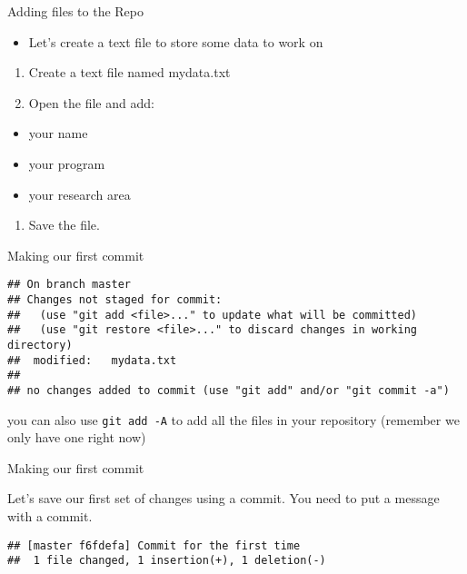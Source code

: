 \documentclass[ignorenonframetext,]{beamer}
\providecommand{\tightlist}{%
  \setlength{\itemsep}{0pt}\setlength{\parskip}{0pt}}
\begin{document}
\begin{frame}{Adding files to the Repo}

\begin{itemize}
\tightlist
\item
  Let's create a text file to store some data to work on
\end{itemize}

\begin{enumerate}
\def\labelenumi{\arabic{enumi}.}
\item
  Create a text file named mydata.txt
\item
  Open the file and add:
\end{enumerate}

\begin{itemize}
\tightlist
\item
  your name
\item
  your program
\item
  your research area
\end{itemize}

\begin{enumerate}
\def\labelenumi{\arabic{enumi}.}
\setcounter{enumi}{2}
\tightlist
\item
  Save the file.
\end{enumerate}

\end{frame}

\begin{frame}[fragile]{Making our first commit}

\begin{verbatim}
## On branch master
## Changes not staged for commit:
##   (use "git add <file>..." to update what will be committed)
##   (use "git restore <file>..." to discard changes in working directory)
##  modified:   mydata.txt
## 
## no changes added to commit (use "git add" and/or "git commit -a")
\end{verbatim}

you can also use \texttt{git\ add\ -A} to add all the files in your
repository (remember we only have one right now)

\end{frame}

\begin{frame}[fragile]{Making our first commit}

Let's save our first set of changes using a commit. You need to put a
message with a commit.

\begin{verbatim}
## [master f6fdefa] Commit for the first time
##  1 file changed, 1 insertion(+), 1 deletion(-)
\end{verbatim}

\end{frame}
\end{document}
